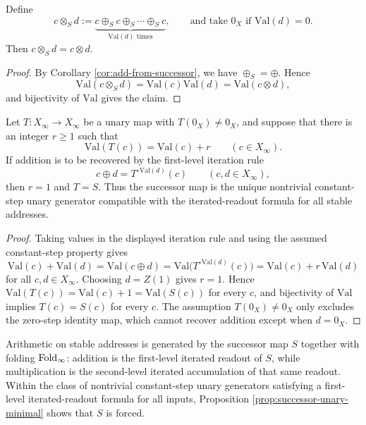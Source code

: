\begin{theorem}\label{thm:mul-from-successor}
Define
\[
c\otimes_S d:=\underbrace{c\oplus_S c\oplus_S\cdots\oplus_S c}_{\mathrm{Val}(d)\text{ times}},
\qquad
\text{and take }0_X\text{ if }\mathrm{Val}(d)=0.
\]
Then \(c\otimes_S d=c\otimes d\).
\end{theorem}

\begin{proof}
By Corollary \ref{cor:add-from-successor}, we have \(\oplus_S=\oplus\). Hence
\[
\mathrm{Val}(c\otimes_S d)=\mathrm{Val}(c)\mathrm{Val}(d)=\mathrm{Val}(c\otimes d),
\]
and bijectivity of \(\mathrm{Val}\) gives the claim.
\end{proof}

\begin{proposition}\label{prop:successor-unary-minimal}
Let \(T:X_\infty\to X_\infty\) be a unary map with \(T(0_X)\ne 0_X\), and suppose that there is an integer \(r\ge 1\) such that
\[
\mathrm{Val}(T(c))=\mathrm{Val}(c)+r
\qquad(c\in X_\infty).
\]
If addition is to be recovered by the first-level iteration rule
\[
c\oplus d=T^{\circ\mathrm{Val}(d)}(c)
\qquad(c,d\in X_\infty),
\]
then \(r=1\) and \(T=S\). Thus the successor map is the unique nontrivial constant-step unary generator compatible with the iterated-readout formula for all stable addresses.
\end{proposition}

\begin{proof}
Taking values in the displayed iteration rule and using the assumed constant-step property gives
\[
\mathrm{Val}(c)+\mathrm{Val}(d)
=\mathrm{Val}(c\oplus d)
=\mathrm{Val}\bigl(T^{\circ\mathrm{Val}(d)}(c)\bigr)
=\mathrm{Val}(c)+r\,\mathrm{Val}(d)
\]
for all \(c,d\in X_\infty\). Choosing \(d=Z(1)\) gives \(r=1\). Hence \(\mathrm{Val}(T(c))=\mathrm{Val}(c)+1=\mathrm{Val}(S(c))\) for every \(c\), and bijectivity of \(\mathrm{Val}\) implies \(T(c)=S(c)\) for every \(c\). The assumption \(T(0_X)\ne 0_X\) only excludes the zero-step identity map, which cannot recover addition except when \(d=0_X\).
\end{proof}

\begin{corollary}\label{cor:primitive-minimal-successor}
Arithmetic on stable addresses is generated by the successor map \(S\) together with folding \(\operatorname{Fold}_\infty\): addition is the first-level iterated readout of \(S\), while multiplication is the second-level iterated accumulation of that same readout. Within the class of nontrivial constant-step unary generators satisfying a first-level iterated-readout formula for all inputs, Proposition \ref{prop:successor-unary-minimal} shows that \(S\) is forced.
\end{corollary}


